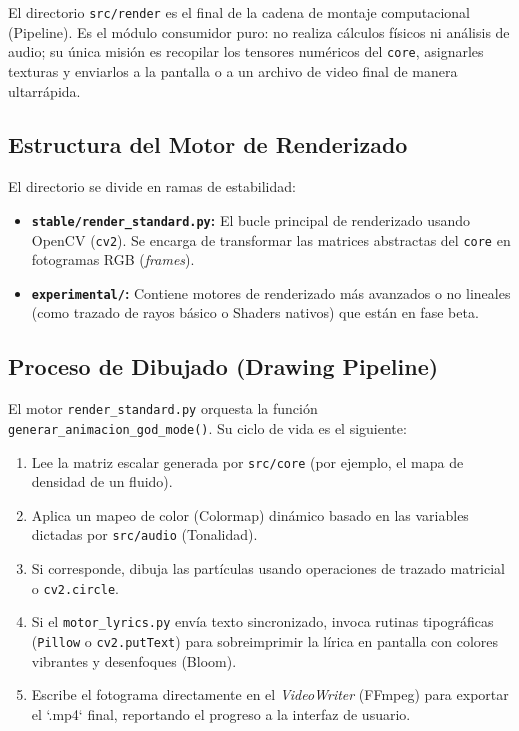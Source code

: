 \documentclass[12pt, openany]{book}
\begin{document}
El directorio \texttt{src/render} es el final de la cadena de montaje computacional (Pipeline). Es el módulo consumidor puro: no realiza cálculos físicos ni análisis de audio; su única misión es recopilar los tensores numéricos del \texttt{core}, asignarles texturas y enviarlos a la pantalla o a un archivo de video final de manera ultarrápida.

\subsection{Estructura del Motor de Renderizado}
El directorio se divide en ramas de estabilidad:
\begin{itemize}
    \item \textbf{\texttt{stable/render\_standard.py}:} El bucle principal de renderizado usando OpenCV (\texttt{cv2}). Se encarga de transformar las matrices abstractas del \texttt{core} en fotogramas RGB (\textit{frames}).
    \item \textbf{\texttt{experimental/}:} Contiene motores de renderizado más avanzados o no lineales (como trazado de rayos básico o Shaders nativos) que están en fase beta.
\end{itemize}

\subsection{Proceso de Dibujado (Drawing Pipeline)}
El motor \texttt{render\_standard.py} orquesta la función \texttt{generar\_animacion\_god\_mode()}. Su ciclo de vida es el siguiente:
\begin{enumerate}
    \item Lee la matriz escalar generada por \texttt{src/core} (por ejemplo, el mapa de densidad de un fluido).
    \item Aplica un mapeo de color (Colormap) dinámico basado en las variables dictadas por \texttt{src/audio} (Tonalidad).
    \item Si corresponde, dibuja las partículas usando operaciones de trazado matricial o \texttt{cv2.circle}.
    \item Si el \texttt{motor\_lyrics.py} envía texto sincronizado, invoca rutinas tipográficas (\texttt{Pillow} o \texttt{cv2.putText}) para sobreimprimir la lírica en pantalla con colores vibrantes y desenfoques (Bloom).
    \item Escribe el fotograma directamente en el \textit{VideoWriter} (FFmpeg) para exportar el `.mp4` final, reportando el progreso a la interfaz de usuario.
\end{enumerate}
\end{document}
